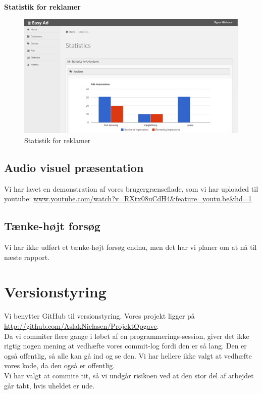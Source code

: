 \documentclass[a4paper,12pt]{article}
\begin{document}
\textbf{Statistik for reklamer}
\begin{figure}[h!]
  \centering
    \includegraphics[width=\textwidth]{statistics.png}
  \caption{Statistik for reklamer}
\end{figure}

\newpage
\subsection*{Audio visuel præsentation}
Vi har lavet en demonstration af vores brugergrænseflade, som vi har uploaded til youtube:
\newline
\url{www.youtube.com/watch?v=RXtx08uCdH4&feature=youtu.be&hd=1}

\subsection*{Tænke-højt forsøg}
Vi har ikke udført et tænke-højt forsøg endnu, men det har vi planer om at nå til næste rapport.

\section{Versionstyring}
Vi benytter GitHub til versionstyring. Vores projekt ligger på
\newline
\url{http://github.com/AslakNiclasen/ProjektOpgave}.
\newline
\\
Da vi commiter flere gange i løbet af en programmerings-session, giver det ikke rigtig nogen mening at vedhæfte vores commit-log fordi den er så lang. Den er også offentlig, så alle kan gå ind og se den. Vi har hellere ikke valgt at vedhæfte vores kode, da den også er offentlig.
\newline
\\
Vi har valgt at commite tit, så vi undgår risikoen ved at den stor del af arbejdet går tabt, hvis uheldet er ude.
\end{document}

